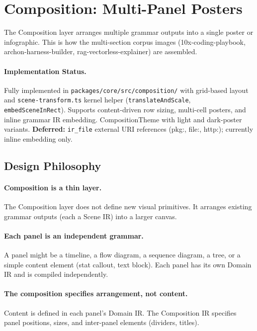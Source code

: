 \section{Composition: Multi-Panel Posters}
\label{sec:composition}

The Composition layer arranges multiple grammar outputs into a single poster or infographic. This is how the multi-section corpus images (10x-coding-playbook, archon-harness-builder, rag-vectorless-explainer) are assembled.

\paragraph{Implementation Status.}
Fully implemented in \texttt{packages/core/src/composition/} with grid-based layout and \texttt{scene-transform.ts} kernel helper (\texttt{translateAndScale}, \texttt{embedSceneInRect}). Supports content-driven row sizing, multi-cell posters, and inline grammar IR embedding. CompositionTheme with light and dark-poster variants. \textbf{Deferred:} \texttt{ir\_file} external URI references (pkg:, file:, http:); currently inline embedding only.

\subsection{Design Philosophy}

\paragraph{Composition is a thin layer.}
The Composition layer does not define new visual primitives. It arranges existing grammar outputs (each a Scene IR) into a larger canvas.

\paragraph{Each panel is an independent grammar.}
A panel might be a timeline, a flow diagram, a sequence diagram, a tree, or a simple content element (stat callout, text block). Each panel has its own Domain IR and is compiled independently.

\paragraph{The composition specifies arrangement, not content.}
Content is defined in each panel's Domain IR. The Composition IR specifies panel positions, sizes, and inter-panel elements (dividers, titles).

